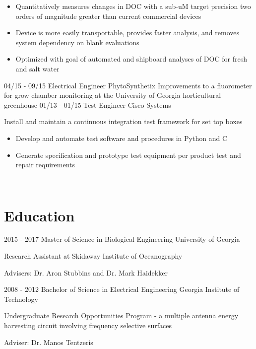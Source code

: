 \documentclass[]{resume}
\begin{document}
\begin{body}
\begin{entrylist}
{\begin{itemize}
    				\item Quantitatively measures changes in DOC with a sub-uM target precision two orders of magnitude greater than current commercial devices
    				\item Device is more easily transportable, provides faster analysis, and removes system dependency on blank evaluations
    				\item Optimized with goal of automated and shipboard analyses of DOC for fresh and salt water\end{itemize}
    		}		  
          \entry
          {04/15 - 09/15}
          {Electrical Engineer}
          {PhytoSynthetix}
          {Improvements to a fluorometer for grow chamber monitoring at the University of Georgia horticultural greenhouse}
          \entry
          {01/13 - 01/15}
          {Test Engineer}
          {Cisco Systems}
          {Install and maintain a continuous integration test framework for set top boxes
          	\begin{itemize}
          		\item Develop and automate test software and procedures in Python and C
          		\item Generate specification and prototype test equipment per product test and repair requirements
          	\end{itemize}
          }
        \end{entrylist}
	~
	\section{Education}
		\begin{entrylist}
			\entry
			{2015 - 2017}
			{Master of Science in Biological Engineering}
			{University of Georgia}
			{Research Assistant at Skidaway Institute of Oceanography
				\begin{description}
					\item Advisers: Dr. Aron Stubbins and Dr. Mark Haidekker
				\end{description}}
			\entry
			{2008 - 2012}
			{Bachelor of Science in Electrical Engineering}
			{Georgia Institute of Technology}
			{
				Undergraduate Research Opportunities Program - a multiple antenna energy harvesting circuit involving frequency selective surfaces
				\begin{description}
					\item Adviser: Dr. Manos Tentzeris
				\end{description}
			}
		\end{entrylist}

\end{body}
\end{document}
